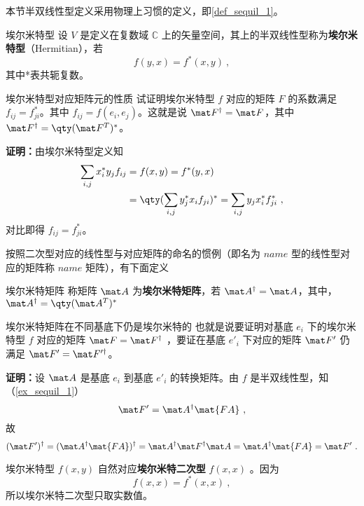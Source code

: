 本节半双线性型定义采用物理上习惯的定义，即\autoref{def_sequil_1}。
\begin{definition}{埃尔米特型}
设 $V$ 是定义在复数域 $\mathbb{C}$ 上的矢量空间，其上的半双线性型称为\textbf{埃尔米特型}（Hermitian），若
\begin{equation}\label{eq_HeFor_2}
f(   y,   x)=f^*(   x,   y)~,
\end{equation}
其中*表共轭复数。
\end{definition}
\begin{example}{埃尔米特型对应矩阵元的性质}
试证明埃尔米特型 $f$ 对应的矩阵 $F$ 的系数满足 $f_{ij}=f_{ji}^*$。其中 $f_{ij}=f(   e_i,   e_j)$。这就是说 $\mat F^\dagger=\mat F$，其中 $\mat F^\dagger=\qty(\mat F^T)^*$。

\textbf{证明：}由埃尔米特型定义知
\begin{equation}
\begin{aligned}
\sum_{i,j}x_i^*y_j f_{ij}&=f(   x,   y)=f^*(   y,   x)\\
&=\qty(\sum_{i,j}y_j^* x_i f_{ji})^*=\sum_{i,j}y_j x_i^*f_{ji}^*~,
\end{aligned}
\end{equation}
对比即得 $f_{ij}=f_{ji}^*$。
\end{example}
按照二次型对应的线性型与对应矩阵的命名的惯例（即名为 $name$ 型的线性型对应的矩阵称 $name$ 矩阵），有下面定义
\begin{definition}{埃尔米特矩阵}
称矩阵 $\mat A$ 为\textbf{埃尔米特矩阵}，若 $\mat A^\dagger=\mat A$，其中，$\mat A^\dagger=\qty(\mat A^T)^*$
\end{definition}
\begin{example}{埃尔米特矩阵在不同基底下仍是埃尔米特的}
也就是说要证明对基底 $   e_i$ 下的埃尔米特型 $f$ 对应的矩阵 $\mat F=\mat F^\dagger$ ，要证在基底 $   e'_i$ 下对应的矩阵 $\mat F'$ 仍满足 $\mat F'=\mat F'^\dagger$。

\textbf{证明：}设 $\mat A$ 是基底 $  e_i$ 到基底 $   e'_i$ 的转换矩阵。由 $f$ 是半双线性型，知（\autoref{ex_sequil_1}）
\begin{equation}
\mat F'=\mat A^\dagger \mat{FA}~,
\end{equation}
 故
\begin{equation}
(\mat F')^\dagger=(\mat A^\dagger \mat{FA})^\dagger=\mat A^\dagger \mat F^\dagger \mat A=\mat A^\dagger \mat{FA}=\mat F'~.
\end{equation}
\end{example}
埃尔米特型 $f(   x,   y)$ 自然对应\textbf{埃尔米特二次型} $f(   x,   x)$ 。因为
\begin{equation}
 f(   x,   x)= f^*(   x,   x) ~,
\end{equation}
所以埃尔米特二次型只取实数值。

